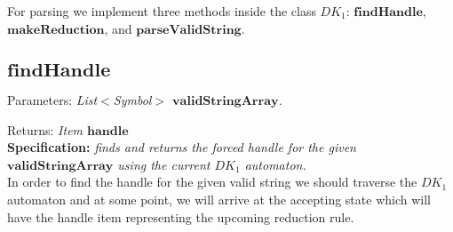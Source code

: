 For parsing we implement three methods inside the class \(DK_{1}\):  \(\boldsymbol{findHandle}\), \(\boldsymbol{makeReduction}\), and \(\boldsymbol{parseValidString}\).

\vspace{10pt}

\subsection{\(\boldsymbol{findHandle}\)}

Parameters: \textit{List\(<\)Symbol\(>\) \(\boldsymbol{validStringArray}\).}

Returns: \textit{Item \(\boldsymbol{handle}\)}\\

\textbf{Specification:} \textit{finds and returns the forced handle for the given \(\boldsymbol{validStringArray}\) using the current \(DK_{1}\) automaton.}\\

In order to find the handle for the given valid string we should traverse the \(DK_{1}\) automaton and at some point, we will arrive at the accepting state which will have the handle item representing the upcoming reduction rule.

\vspace{10pt}

